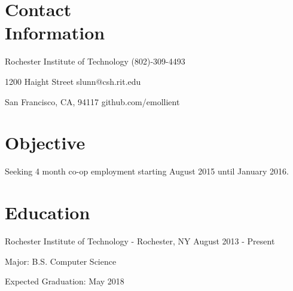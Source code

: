 \documentclass[a4paper,margin,line]{resume}
\newcommand{\rdate}[1]{\hfill {\small #1}}
\begin{document}
\begin{resume}
\section{\mysidestyle Contact \\ Information} \vspace{2mm}
	\begin{asparablank}
		\item Rochester Institute of Technology \hfill (802)-309-4493
		\item 1200 Haight Street \hfill slunn@csh.rit.edu
		\item San Francisco, CA, 94117 \hfill github.com/emollient
	\end{asparablank}

\section{\mysidestyle Objective}
	\begin{asparablank}
    	\item Seeking 4 month co-op employment starting August 2015 until January 2016.
	\end{asparablank}

\section{\mysidestyle Education}
	\begin{compactdesc}
		\item[Rochester Institute of Technology] - Rochester, NY \rdate{August 2013 - Present}
		\begin{asparablank} { \small
			\item Major: B.S. Computer Science
		} \end{asparablank}
		\begin{asparablank} { \small
			\item Expected Graduation: May 2018
		} \end{asparablank}
	\end{compactdesc}


\end{resume}
\end{document}
